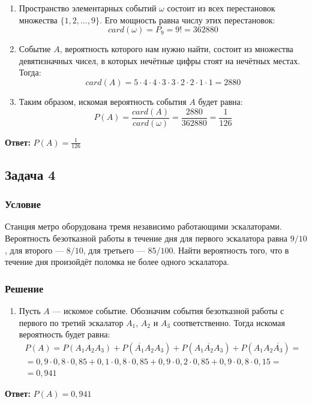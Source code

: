 \documentclass[14pt]{article}
\begin{document}
    \begin{enumerate}[wide, labelwidth=!, labelindent=0pt]
        \item Пространство элементарных событий $\omega$ состоит из всех перестановок множества $\{1, 2, ..., 9\}$.
        Его мощность равна числу этих перестановок:
        \[card (\omega)= P_9 = 9! = 362880\]
        \item Событие $A$, вероятность которого нам нужно найти, состоит из множества девятизначных чисел, в которых нечётные цифры стоят на нечётных местах.
        Тогда:
        \[card (A) = 5 \cdot 4 \cdot 4 \cdot 3 \cdot 3 \cdot 2 \cdot 2 \cdot 1 \cdot 1 = 2880\]
        \item Таким образом, искомая вероятность события $A$ будет равна:
        \[P(A) = \frac{card(A)}{card(\omega)} = \frac{2880}{362880} = \frac{1}{126}\]
    \end{enumerate}
    \hspace{290pt}\textbf{Ответ:} $P(A) = \frac{1}{126}$

    \subsection*{Задача 4}
    \subsubsection*{Условие}

    Станция метро оборудована тремя независимо работающими эскалаторами.
    Вероятность безотказной работы в течение дня для первого эскалатора равна $9/10$, для второго --- $8/10$, для третьего --- $85/100$.
    Найти вероятность того, что в течение дня произойдёт поломка не более одного эскалатора.

    \subsubsection*{Решение}

    \begin{enumerate}[wide, labelwidth=!, labelindent=0pt]
        \item Пусть $A$ --- искомое событие. Обозначим события безотказной работы с первого по третий эскалатор $A_1$, $A_2$ и $A_3$ соответственно.
        Тогда искомая вероятность будет равна:
        \begin{gather*}
            P(A) = P(A_1 A_2 A_3) + P(\overline{A_1} A_2 A_3) + P(A_1 \overline{A_2} A_3) + P(A_1 A_2 \overline{A_3}) =\\
            = 0,9 \cdot 0,8 \cdot 0,85 + 0,1 \cdot 0,8 \cdot 0,85 + 0,9 \cdot 0,2 \cdot 0,85 + 0,9 \cdot 0,8 \cdot 0,15 =\\
            = 0,941
        \end{gather*}
    \end{enumerate}
    \hspace{290pt}\textbf{Ответ:} $P(A) = 0,941$
\end{document}
